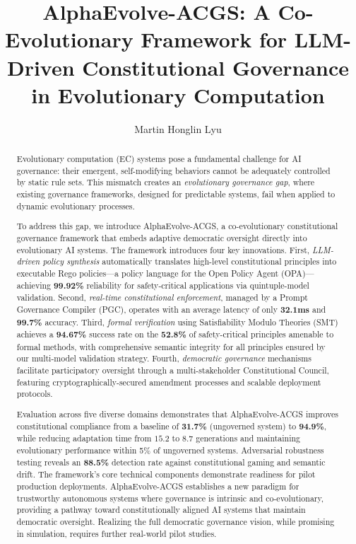 \documentclass[manuscript,screen,review,anonymous,9pt]{acmart}
\begin{document}
\title{AlphaEvolve-ACGS: A Co-Evolutionary Framework for LLM-Driven Constitutional Governance in Evolutionary Computation}

\author{Martin Honglin Lyu}

\begin{abstract}
Evolutionary computation (EC) systems pose a fundamental challenge for AI governance: their emergent, self-modifying behaviors cannot be adequately controlled by static rule sets. This mismatch creates an \textit{evolutionary governance gap}, where existing governance frameworks, designed for predictable systems, fail when applied to dynamic evolutionary processes.

To address this gap, we introduce AlphaEvolve-ACGS, a co-evolutionary constitutional governance framework that embeds adaptive democratic oversight directly into evolutionary AI systems. The framework introduces four key innovations. First, \textit{LLM-driven policy synthesis} automatically translates high-level constitutional principles into executable Rego policies---a policy language for the Open Policy Agent (OPA)---achieving \textbf{99.92\%} reliability for safety-critical applications via quintuple-model validation. Second, \textit{real-time constitutional enforcement}, managed by a Prompt Governance Compiler (PGC), operates with an average latency of only \textbf{32.1ms} and \textbf{99.7\%} accuracy. Third, \textit{formal verification} using Satisfiability Modulo Theories (SMT) achieves a \textbf{94.67\%} success rate on the \textbf{52.8\%} of safety-critical principles amenable to formal methods, with comprehensive semantic integrity for all principles ensured by our multi-model validation strategy. Fourth, \textit{democratic governance} mechanisms facilitate participatory oversight through a multi-stakeholder Constitutional Council, featuring cryptographically-secured amendment processes and scalable deployment protocols.

Evaluation across five diverse domains demonstrates that AlphaEvolve-ACGS improves constitutional compliance from a baseline of \textbf{31.7\%} (ungoverned system) to \textbf{94.9\%}, while reducing adaptation time from $15.2$ to $8.7$ generations and maintaining evolutionary performance within 5\% of ungoverned systems. Adversarial robustness testing reveals an \textbf{88.5\%} detection rate against constitutional gaming and semantic drift. The framework's core technical components demonstrate readiness for pilot production deployments. AlphaEvolve-ACGS establishes a new paradigm for trustworthy autonomous systems where governance is intrinsic and co-evolutionary, providing a pathway toward constitutionally aligned AI systems that maintain democratic oversight. Realizing the full democratic governance vision, while promising in simulation, requires further real-world pilot studies.
\end{abstract}
\end{document}
